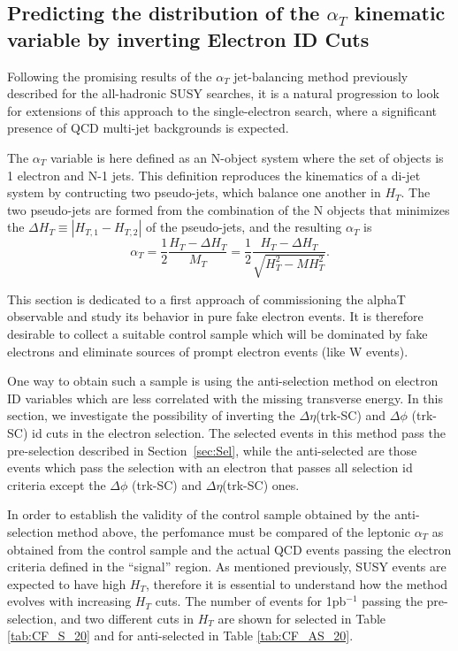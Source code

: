 
\subsection{Predicting the distribution of the $\alpha{_T}$ kinematic variable by inverting Electron ID Cuts}

Following the promising results of the $\alpha_{T}$ jet-balancing method previously described for the all-hadronic SUSY searches, it is a natural progression to look for extensions of this approach to the single-electron search, where a significant presence of QCD multi-jet backgrounds is expected.

The $\alpha_{T}$ variable is here defined as an N-object system where the set of objects is 1 electron and N-1 jets. This definition reproduces the kinematics of a di-jet system by contructing two pseudo-jets, which balance one another in $H_{T}$. The two pseudo-jets are formed from the combination of the N objects that minimizes the $\Delta H_{T} \equiv |H_{T,1} - H_{T,2}|$ of the pseudo-jets, and the resulting  $\alpha_{T}$ is
\begin{equation}
\alpha_{T} = \frac{1}{2} \frac{H_{T} - \Delta H_{T}}{M_{T}} =  \frac{1}{2} \frac{H_{T} - \Delta H_{T}}{\sqrt{H_{T}^{2}-MH_{T}^{2}}}.
\end{equation}

This section is dedicated to a first approach of commissioning the alphaT observable and study its behavior in pure fake electron events. It is therefore desirable to collect a suitable control sample which will be dominated by fake electrons and eliminate sources of prompt electron events (like W events).

One way to obtain such a sample is using the anti-selection method on electron ID variables which are less correlated with the missing transverse energy. In this section, we investigate the possibility of inverting the $\Delta \eta$(trk-SC) and $\Delta \phi$ (trk-SC) id cuts in the electron selection. The selected events in this method pass the pre-selection described in Section~\ref{sec:Sel}, while the anti-selected are those events which pass the selection with an electron that passes all selection id criteria except the $\Delta \phi$ (trk-SC) and $\Delta \eta$(trk-SC) ones. 

In order to establish the validity of the control sample obtained by the anti-selection method above, the perfomance must be compared of the leptonic $\alpha_T$ as obtained from the control sample and the actual QCD events passing the electron criteria defined in the ``signal'' region. As mentioned previously, SUSY events are expected to have high $H_{T}$, therefore it is essential to understand how the method evolves with increasing $H_{T}$ cuts. The number of events for 1pb$^{-1}$ passing the pre-selection, and two different cuts in $H_{T}$ are shown for selected in Table \ref{tab:CF_S_20} and for anti-selected in Table \ref{tab:CF_AS_20}. 

